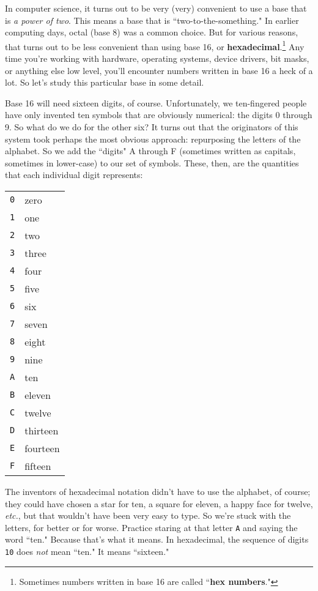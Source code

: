 In computer science, it turns out to be very (very) convenient to use a
base that is \textit{a power of two}. This means a base that is
``two-to-the-something." In earlier computing days, octal (base 8) was a
common choice. But for various reasons, that turns out to be less
convenient than using base 16, or \textbf{hexadecimal}.\footnote{Sometimes
numbers written in base 16 are called ``\textbf{hex numbers}."} Any time
you're working with hardware, operating systems, device drivers, bit masks,
or anything else low level, you'll encounter numbers written in base 16 a
heck of a lot. So let's study this particular base in some detail.

Base 16 will need sixteen digits, of course. Unfortunately, we
ten-fingered people have only invented ten symbols that are obviously
numerical: the digits 0 through 9. So what do we do for the other six?
It turns out that the originators of this system took perhaps the most
obvious approach: repurposing the letters of the alphabet. So we add the
``digits" A through F (sometimes written as capitals, sometimes in
lower-case) to our set of symbols. These, then, are the quantities that
each individual digit represents:
\begin{center}
\begin{tabular}{c l}
\texttt{0} & zero \\
\texttt{1} & one \\
\texttt{2} & two \\
\texttt{3} & three \\
\texttt{4} & four \\
\texttt{5} & five \\
\texttt{6} & six \\
\texttt{7} & seven \\
\texttt{8} & eight \\
\texttt{9} & nine \\
\texttt{A} & ten \\
\texttt{B} & eleven \\
\texttt{C} & twelve \\
\texttt{D} & thirteen \\
\texttt{E} & fourteen \\
\texttt{F} & fifteen \\
\end{tabular}
\end{center}
The inventors of hexadecimal notation didn't have to use the alphabet, of
course; they could have chosen a star for ten, a square for eleven, a happy
face for twelve, \textit{etc.}, but that wouldn't have been very easy to
type. So we're stuck with the letters, for better or for worse. Practice
staring at that letter \texttt{A} and saying the word ``ten." Because
that's what it means. In hexadecimal, the sequence of digits \texttt{10}
does \textit{not} mean ``ten." It means ``sixteen."

